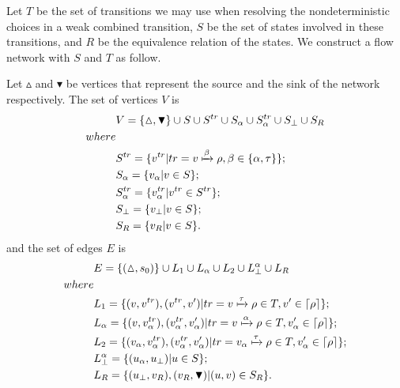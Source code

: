 \documentclass[a4paper,runningheads]{llncs}
\begin{document}
Let $T$ be the set of transitions we may use when resolving the nondeterministic choices in a weak combined transition, $S$ be the set of states involved in these transitions, and $R$ be the equivalence relation of the states. We construct a flow network with $S$ and $T$ as follow.

Let $\vartriangle$ and $\blacktriangledown$ be vertices that represent the source and the sink of the network respectively. The set of vertices $V$ is
\begin{equation*}
    \begin{aligned}
    & V=\{\vartriangle,\blacktriangledown\}\cup S\cup S^{tr}\cup S_{\alpha}\cup S_{\alpha}^{tr}\cup S_{\bot}\cup S_{R}\\
    where &\\
    & S^{tr}=\{v^{tr}|tr=v \xmapsto{\beta} \rho ,\beta\in\{\alpha,\tau\}\};\\
    & S_{\alpha}=\{v_{\alpha}|v\in S\};\\
    & S_{\alpha}^{tr}=\{v_{\alpha}^{tr}|v^{tr}\in S^{tr}\};\\
    & S_{\bot}=\{v_{\bot}|v\in S\};\\
    & S_{R}=\{v_{R}|v\in S\}.
    \end{aligned}
\end{equation*}
and the set of edges $E$ is
\begin{equation*}
    \begin{aligned}
    & E=\{(\vartriangle,s_{0})\}\cup L_{1}\cup L_{\alpha}\cup L_{2}\cup L_{\bot}^{\alpha}\cup L_{R}\\
    where &\\
    & L_{1}=\{(v,v^{tr}),(v^{tr},v')|tr=v\xmapsto{\tau}\rho\in T,v'\in\lceil\rho\rceil\};\\
    & L_{\alpha}=\{(v,v_{\alpha}^{tr}),(v_{\alpha}^{tr},v'_{\alpha})|tr=v\xmapsto{\alpha}\rho\in T,v'_{\alpha}\in\lceil\rho\rceil\};\\
    & L_{2}=\{(v_{\alpha},v_{\alpha}^{tr}),(v_{\alpha}^{tr},v'_{\alpha})|tr=v_{\alpha}\xmapsto{\tau}\rho\in T,v'_{\alpha}\in\lceil\rho\rceil\};\\
    & L_{\bot}^{\alpha}=\{(u_{
    \alpha},u_{\bot})|u\in S\};\\
    & L_{R}=\{(u_{\bot},v_{R}),(v_{R},\blacktriangledown)|(u,v)\in S_{R}\}.
    \end{aligned}
\end{equation*}
\end{document}
